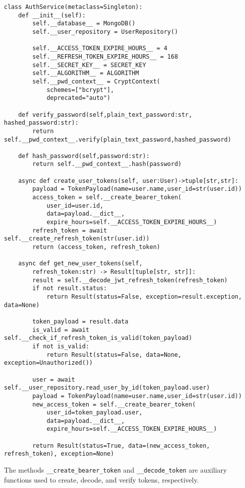 \begin{verbatim}
class AuthService(metaclass=Singleton):
    def __init__(self):
        self.__database__ = MongoDB()
        self.__user_repository = UserRepository()

        self.__ACCESS_TOKEN_EXPIRE_HOURS__ = 4
        self.__REFRESH_TOKEN_EXPIRE_HOURS__ = 168
        self.__SECRET_KEY__ = SECRET_KEY
        self.__ALGORITHM__ = ALGORITHM
        self.__pwd_context__ = CryptContext(
            schemes=["bcrypt"],
            deprecated="auto")

    def verify_password(self,plain_text_password:str, hashed_password:str):
        return self.__pwd_context__.verify(plain_text_password,hashed_password)

    def hash_password(self,password:str):
        return self.__pwd_context__.hash(password)
    
    async def create_user_tokens(self, user:User)->tuple[str,str]:
        payload = TokenPayload(name=user.name,user_id=str(user.id))
        access_token = self.__create_bearer_token(
            user_id=user.id,
            data=payload.__dict__,
            expire_hours=self.__ACCESS_TOKEN_EXPIRE_HOURS__)
        refresh_token = await self.__create_refresh_token(str(user.id))
        return (access_token, refresh_token)
        
    async def get_new_user_tokens(self,
        refresh_token:str) -> Result[tuple[str, str]]:
        result = self.__decode_jwt_refresh_token(refresh_token)
        if not result.status:
            return Result(status=False, exception=result.exception, data=None)
        
        token_payload = result.data
        is_valid = await self.__check_if_refresh_token_is_valid(token_payload)
        if not is_valid:
            return Result(status=False, data=None, exception=Unauthorized())
        
        user = await self.__user_repository.read_user_by_id(token_payload.user)
        payload = TokenPayload(name=user.name,user_id=str(user.id))
        new_access_token = self.__create_bearer_token(
            user_id=token_payload.user,
            data=payload.__dict__,
            expire_hours=self.__ACCESS_TOKEN_EXPIRE_HOURS__)

        return Result(status=True, data=(new_access_token, refresh_token), exception=None)
\end{verbatim}

The methods \texttt{\_\_create\_bearer\_token} and \texttt{\_\_decode\_token} are auxiliary functions used to create, decode, and verify tokens, respectively.

